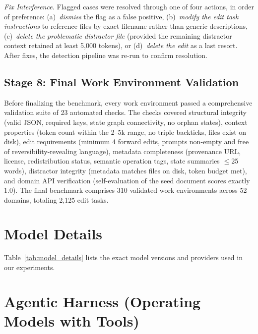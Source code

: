 \documentclass{article} %
\begin{document}
\textit{Fix Interference.} Flagged cases were resolved through one of four actions, in order of preference: (a)~\textit{dismiss} the flag as a false positive, (b)~\textit{modify the edit task instructions} to reference files by exact filename rather than generic descriptions, (c)~\textit{delete the problematic distractor file} (provided the remaining distractor context retained at least 5,000 tokens), or (d)~\textit{delete the edit} as a last resort. After fixes, the detection pipeline was re-run to confirm resolution.

\subsection{Stage 8: Final Work Environment Validation} \label{app:final_validation}
Before finalizing the benchmark, every work environment passed a comprehensive validation suite of 23 automated checks. The checks covered structural integrity (valid JSON, required keys, state graph connectivity, no orphan states), context properties (token count within the 2--5k range, no triple backticks, files exist on disk), edit requirements (minimum 4 forward edits, prompts non-empty and free of reversibility-revealing language), metadata completeness (provenance URL, license, redistribution status, semantic operation tags, state summaries $\leq$25 words), distractor integrity (metadata matches files on disk, token budget met), and domain API verification (self-evaluation of the seed document scores exactly 1.0). The final benchmark comprises 310 validated work environments across 52 domains, totaling 2,125 edit tasks.


\section{Model Details} \label{app:model_details}

Table~\ref{tab:model_details} lists the exact model versions and providers used in our experiments.

\begin{table}[h!]

\caption{Model details for the 19 LLMs evaluated in \benchmark{}.}
\label{tab:model_details}
\end{table}


\section{Agentic Harness (Operating Models with Tools)} \label{app:agentic_harness}
\end{document}
